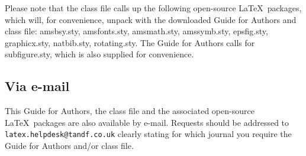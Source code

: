 \documentclass{rQUF2e}
\theoremstyle{plain}
\theoremstyle{definition}
\theoremstyle{remark}
\begin{document}
Please note that the class file calls up the following open-source \LaTeX\ packages, which will, for convenience, unpack with the downloaded Guide for Authors and class file: amsbsy.sty, amsfonts.sty, amsmath.sty, amssymb.sty, epsfig.sty, graphicx.sty, natbib.sty, rotating.sty. The Guide for Authors calls for subfigure.sty, which is also supplied for convenience.


\subsection{Via e-mail}

This Guide for Authors, the class file and the associated open-source \LaTeX\ packages are also available by e-mail. Requests should be addressed to {\tt latex.helpdesk@tandf.co.uk} clearly stating for which journal you require the Guide for Authors and/or class file.
\end{document}
